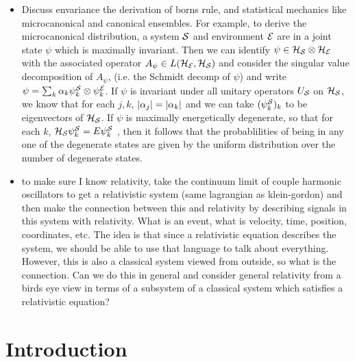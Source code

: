 \documentclass{book}
\begin{document}
\begin{itemize}
		\item {} Discuss envariance the derivation of borns rule, and statistical mechanics like microcanonical and canonical ensembles. For example, to derive the microcanonical distribution, a system $\mathcal{S}$ and environment $\mathcal{E}$ are in a joint state $\psi$ which is maximally invariant. Then we can identify $\psi \in \mathcal{H}_{\mathcal{S}} \otimes \mathcal{H}_{\mathcal{E}}$ with the associated operator $A_{\psi} \in L(\mathcal{H}_{\mathcal{E}}, \mathcal{H}_{\mathcal{S}})$ and consider the singular value decomposition of $A_{\psi}$, (i.e. the Schmidt decomp of $\psi$) and write $\psi = \sum_{k} \alpha_k \psi^{\mathcal{S}}_k \otimes \psi^{\mathcal{E}}_k$. If $\psi$ is invariant under all unitary operators $U_{\mathcal{S}}$ on $\mathcal{H}_{\mathcal{S}}$, we know that for each $j, k$, $|\alpha_j| = |\alpha_k|$ and we can take $(\psi^{\mathcal{S}}_k)_k$ to be eigenvectors of $\mathcal{H}_{\mathcal{S}}$. If $\psi$ is maximally energetically degenerate, so that for each $k$, $\mathcal{H}_{\mathcal{S}} \psi^{\mathcal{S}}_k = E \psi^{\mathcal{S}}_k$ , then it follows that the probablilities of being in any one of the degenerate states are given by the uniform distribution over the number of degenerate states.  
		\item to make sure I know relativity, take the continuum limit of couple harmonic oscillators to get a relativistic system (same lagrangian as klein-gordon) and then make the connection between this and relativity by describing signals in this system with relativity. What is an event, what is velocity, time, position, coordinates, etc. The idea is that since a relativistic equation describes the system, we should be able to use that language to talk about everything. However, this is also a classical system viewed from outside, so what is the connection. Can we do this in general and consider general relativity from a birds eye view in terms of a subsystem of a classical system which satisfies a relativistic equation?
	\end{itemize}
	
	\section{Introduction}
	
	
	
	\section{}
	
\end{document}
